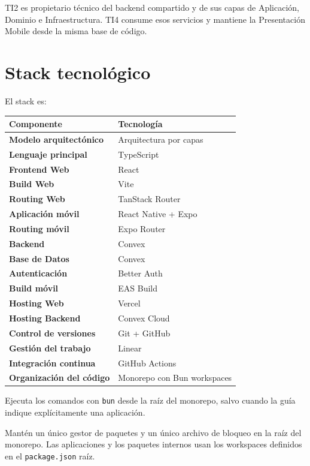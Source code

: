 \documentclass[11pt,a4paper]{article}
\begin{document}
TI2 es propietario técnico del backend compartido y de sus capas de Aplicación,
Dominio e Infraestructura. TI4 consume esos servicios y mantiene la
Presentación Mobile desde la misma base de código.

\section{Stack tecnológico}

El stack es:

\begin{table}[h]
  \centering
  \begin{tabularx}{\textwidth}{>{\bfseries}l X}
    \toprule
    Componente & Tecnología \\
    \midrule
    Modelo arquitectónico & Arquitectura por capas \\
    Lenguaje principal & TypeScript \\
    Frontend Web & React \\
    Build Web & Vite \\
    Routing Web & TanStack Router \\
    Aplicación móvil & React Native + Expo \\
    Routing móvil & Expo Router \\
    Backend & Convex \\
    Base de Datos & Convex \\
    Autenticación & Better Auth \\
    Build móvil & EAS Build \\
    Hosting Web & Vercel \\
    Hosting Backend & Convex Cloud \\
    Control de versiones & Git + GitHub \\
    Gestión del trabajo & Linear \\
    Integración continua & GitHub Actions \\
    Organización del código & Monorepo con Bun workspaces \\
    \bottomrule
  \end{tabularx}
\end{table}

Ejecuta los comandos con \texttt{bun} desde la raíz del monorepo, salvo cuando
la guía indique explícitamente una aplicación.

Mantén un único gestor de paquetes y un único archivo de bloqueo en la raíz del
monorepo. Las aplicaciones y los paquetes internos usan los workspaces
definidos en el \texttt{package.json} raíz.
\end{document}

